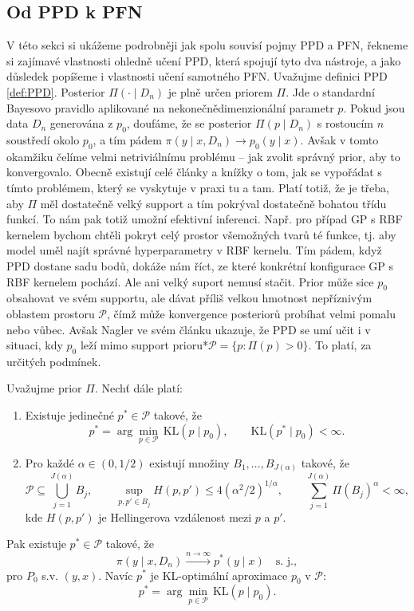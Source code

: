\subsection{Od PPD k PFN}
V této sekci si ukážeme podrobněji jak spolu souvisí pojmy PPD a PFN, řekneme si zajímavé vlastnosti ohledně učení PPD, která spojují tyto dva nástroje, a jako důsledek popíšeme i vlastnosti učení samotného PFN.
Uvažujme definici PPD \ref{def:PPD}.
Posterior $\Pi(\cdot \mid D_n)$ je plně určen priorem $\Pi$.
Jde o standardní Bayesovo pravidlo aplikované na nekonečnědimenzionální parametr $p$. 
Pokud jsou data $D_n$ generována z $p_0$, doufáme, že se posterior $\Pi(p \mid D_n)$ s rostoucím $n$ soustředí okolo $p_0$, a tím pádem $\pi(y \mid x, D_n) \to p_0(y \mid x)$.
Avšak v tomto okamžiku čelíme velmi netriviálnímu problému – jak zvolit správný prior, aby to konvergovalo.
Obecně existují celé články a knížky o tom, jak se vypořádat s tímto problémem, který se vyskytuje v praxi tu a tam.
Platí totiž, že je třeba, aby $\Pi$ měl dostatečně velký support a tím pokrýval dostatečně bohatou třídu funkcí.
To nám pak totiž umožní efektivní inferenci.
Např. pro případ GP s RBF kernelem bychom chtěli pokryt celý prostor všemožných tvarů té funkce, tj. aby model uměl najít správné hyperparametry v RBF kernelu.
Tím pádem, když PPD dostane sadu bodů, dokáže nám říct, ze které konkrétní konfigurace GP s RBF kernelem pochází.
Ale ani velký suport nemusí stačit.
Prior může sice $p_0$ obsahovat ve svém supportu, ale dávat příliš velkou hmotnost nepříznivým oblastem prostoru $\mathcal{P}$, čímž může konvergence posteriorů probíhat velmi pomalu nebo vůbec.
Avšak Nagler ve svém článku ukazuje, že PPD se umí učit i v situaci, kdy $p_0$ leží mimo support prioru*$\mathcal{P} = \{p : \Pi(p) > 0\}$.
To platí, za určitých podmínek.

\begin{theorem}
    Uvažujme prior $\Pi$. Nechť dále platí:
    \begin{enumerate}
        \item Existuje jedinečné $p^* \in \mathcal{P}$ takové, že
            $$p^* = \arg\min_{p \in \mathcal{P}} \, \mathrm{KL}(p \mid p_0), \qquad \mathrm{KL}(p^* \mid p_0) < \infty.$$
        \item Pro každé $\alpha \in (0, 1/2)$ existují množiny $B_1, \ldots, B_{J(\alpha)}$ takové, že
            $$\mathcal{P} \subseteq \bigcup_{j=1}^{J(\alpha)} B_j, \qquad \sup_{p, p' \in B_j} H(p, p') \leq 4(\alpha^2/2)^{1/\alpha}, \qquad \sum_{j=1}^{J(\alpha)} \Pi(B_j)^\alpha < \infty,$$
            kde $H(p, p')$ je Hellingerova vzdálenost mezi $p$ a $p'$.
    \end{enumerate}
    Pak existuje $p^* \in \mathcal{P}$ takové, že
    $$\pi(y \mid x, D_n) \xrightarrow{n \to \infty} p^*(y \mid x) \quad \text{s. j.},$$
    pro $P_0$ s.v. $(y, x)$. 
    Navíc $p^*$ je KL-optimální aproximace $p_0$ v $\mathcal{P}$:
    $$p^* = \arg\min_{p \in \mathcal{P}} \, \mathrm{KL}(p \mid p_0).$$
\label{theorem:PPDcanLearn}
\end{theorem}

